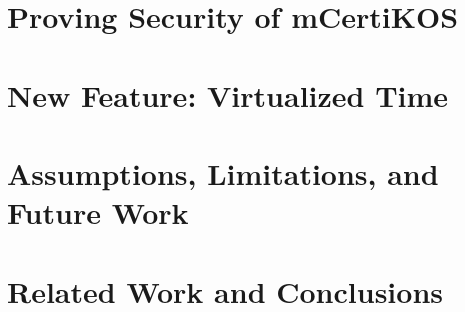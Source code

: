 \documentclass[letterpaper,12pt,nonatbib]{yalephd}
\begin{document}
\chapter{Proving Security of mCertiKOS}


\chapter{New Feature: Virtualized Time}


\chapter{Assumptions, Limitations, and Future Work}


\chapter{Related Work and Conclusions}




\backmatter


\end{document}
